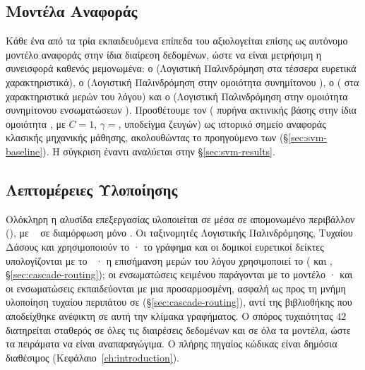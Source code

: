\subsection{Μοντέλα Αναφοράς}
\label{subsec:baselines}

Κάθε ένα από τα τρία εκπαιδευόμενα επίπεδα του  αξιολογείται επίσης ως
αυτόνομο μοντέλο αναφοράς στην ίδια διαίρεση δεδομένων, ώστε να είναι μετρήσιμη η
συνεισφορά καθενός μεμονωμένα: ο \texttt{} (Λογιστική
Παλινδρόμηση στα τέσσερα ευρετικά χαρακτηριστικά), ο \texttt{}
(Λογιστική Παλινδρόμηση στην ομοιότητα συνημίτονου ), ο
\texttt{} ( στα χαρακτηριστικά μερών του λόγου) και ο
\texttt{} (Λογιστική Παλινδρόμηση στην ομοιότητα συνημίτονου
ενσωματώσεων ).
Προσθέτουμε τον \texttt{}
( πυρήνα ακτινικής βάσης στην ίδια ομοιότητα , με
$C=1$, $\gamma=$, υποδείγμα \SvmSampleSize{} ζευγών) ως ιστορικό σημείο αναφοράς
κλασικής μηχανικής μάθησης, ακολουθώντας το προηγούμενο των \textcite{alhasan2006link} (\S\ref{sec:svm-baseline}).
Η σύγκριση  έναντι
 αναλύεται στην \S\ref{sec:svm-results}.

\subsection{Λεπτομέρειες Υλοποίησης}
\label{subsec:implementation-details}

Ολόκληρη η αλυσίδα επεξεργασίας υλοποιείται σε  μέσα σε
απομονωμένο περιβάλλον  (\texttt{}), με ~\cite{paszke2019pytorch} σε
διαμόρφωση μόνο .
Οι ταξινομητές Λογιστικής Παλινδρόμησης, Τυχαίου Δάσους
και  χρησιμοποιούν το · το γράφημα και οι δομικοί
ευρετικοί δείκτες υπολογίζονται με το ~\cite{hagberg2008exploring}· η επισήμανση μερών του λόγου
χρησιμοποιεί το  (\texttt{} και
\texttt{}, \S\ref{sec:cascade-routing}); οι
ενσωματώσεις κειμένου παράγονται με το μοντέλο 
\texttt{}· και οι ενσωματώσεις  εκπαιδεύονται με
μια προσαρμοσμένη, ασφαλή ως προς τη μνήμη υλοποίηση τυχαίου περιπάτου σε
 (\S\ref{sec:cascade-routing}), αντί της βιβλιοθήκης  που αποδείχθηκε ανέφικτη σε αυτή την κλίμακα γραφήματος.
Ο σπόρος τυχαιότητας
$42$ διατηρείται σταθερός σε όλες τις διαιρέσεις δεδομένων και σε όλα τα μοντέλα,
ώστε τα πειράματα να είναι αναπαραγώγιμα.
Ο πλήρης πηγαίος κώδικας είναι δημόσια
διαθέσιμος (Κεφάλαιο~\ref{ch:introduction}).



